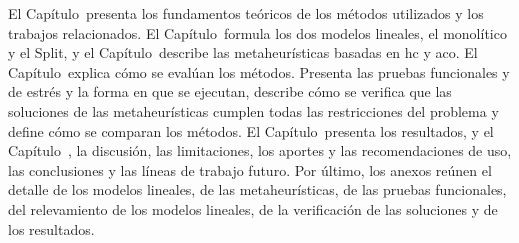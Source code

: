 El Capítulo~\in[Capitulo_2] presenta los fundamentos teóricos de los métodos
utilizados y los trabajos relacionados. El Capítulo~\in[Capitulo_3] formula
los dos modelos lineales, el monolítico y el Split, y el
Capítulo~\in[Capitulo_4] describe las metaheurísticas basadas en \ac{hc} y
\ac{aco}. El Capítulo~\in[Capitulo_5] explica cómo se evalúan los métodos.
Presenta las pruebas funcionales y de estrés y la forma en que se ejecutan,
describe cómo se verifica que las soluciones de las metaheurísticas cumplen
todas las restricciones del problema y define cómo se comparan los métodos.
El Capítulo~\in[Capitulo_6] presenta los resultados, y el
Capítulo~\in[Capitulo_7], la discusión, las limitaciones, los aportes y
las recomendaciones de uso, las conclusiones y las líneas de trabajo futuro. Por último, los anexos reúnen el detalle de los modelos lineales, de las
metaheurísticas, de las pruebas funcionales, del relevamiento de los modelos
lineales, de la verificación de las soluciones y de los resultados.

\stopsection
\stopchapter

